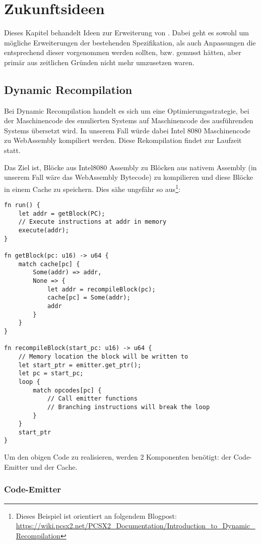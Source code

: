 \chapter{Zukunftsideen}

Dieses Kapitel behandelt Ideen zur Erweiterung von \Emu. Dabei geht es sowohl um mögliche Erweiterungen der bestehenden Spezifikation, als auch Anpassungen die entsprechend dieser vorgenommen werden sollten, bzw. gemusst hätten, aber primär aus zeitlichen Gründen nicht mehr umzusetzen waren.

\section{Dynamic Recompilation}

Bei Dynamic Recompilation handelt es sich um eine Optimierungsstrategie, bei der Maschinencode des emulierten Systems auf Maschinencode des ausführenden Systems übersetzt wird. In unserem Fall würde dabei Intel 8080 Maschinencode zu WebAssembly kompiliert werden. Diese Rekompilation findet zur Laufzeit statt.

Das Ziel ist, Blöcke aus Intel8080 Assembly zu Blöcken aus nativem Assembly (in unserem Fall wäre das WebAssembly Bytecode) zu kompilieren und diese Blöcke in einem Cache zu speichern. Dies sähe ungefähr so aus\footnote{Dieses Beispiel ist orientiert an folgendem Blogpost: \url{https://wiki.pcsx2.net/PCSX2_Documentation/Introduction_to_Dynamic_Recompilation}}:


\begin{verbatim}
fn run() {
    let addr = getBlock(PC);
    // Execute instructions at addr in memory
    execute(addr);
}

fn getBlock(pc: u16) -> u64 {
    match cache[pc] {
        Some(addr) => addr,
        None => {
            let addr = recompileBlock(pc);
            cache[pc] = Some(addr);
            addr
        }
    }
}

fn recompileBlock(start_pc: u16) -> u64 {
    // Memory location the block will be written to
    let start_ptr = emitter.get_ptr();
    let pc = start_pc;
    loop {
        match opcodes[pc] {
            // Call emitter functions
            // Branching instructions will break the loop
        }
    }
    start_ptr
}
\end{verbatim}

Um den obigen Code zu realisieren, werden 2 Komponenten benötigt: der Code-Emitter und der Cache.

\subsection{Code-Emitter}

